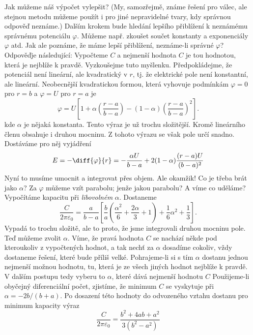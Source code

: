     Jak můžeme náš výpočet vylepšit? (My, samozřejmě, známe řešení pro válec, ale stejnou metodu
    můžeme použít i pro jiné nepravidelné tvary, kdy správnou odpověď neznáme.) Dalším krokem bude
    hledání lepšího přiblížení k neznámému správnému potenciálu \(\varphi\). Můžeme např. zkoušet
    součet konstanty a exponenciály \(\varphi\) atd. Jak ale poznáme, že máme lepší přiblížení,
    neznáme-li správné \(\varphi\)? Odpověďje následující: Vypočteme \(C\) a nejmenší hodnota \(C\)
    je tou hodnotou, která je nejblíže k pravdě. Vyzkoušejme tuto myšlenku. Předpokládejme, že
    potenciál není lineární, ale kvadratický v \(r\), tj. že elektrické pole není konstantní, ale
    lineární. Neobecnější kvadratickou formou, která vyhovuje podmínkám \(\varphi = 0\) pro \(r=b\)
    a \(\varphi=U\) pro \(r=a\) je
    \begin{equation*}
      \varphi = U\left[1 + \alpha \left(\dfrac{r-a}{b-a}\right) 
                    - (1 - \alpha)\left(\dfrac{r-a}{b-a}\right)^2\right].
    \end{equation*}
    kde \(\alpha\) je nějaká konstanta. Tento výraz je už trochu složitější. Kromě lineárního členu
    obsahuje i druhou mocninu. Z tohoto výrazu se však pole určí snadno. Dostáváme pro něj vyjádření
    \begin{equation*}
      E = -\diff{\varphi}{r} = - \dfrac{\alpha U}{b-a} + 2(1 - \alpha)\dfrac{(r-a)U}{(b-a)^2}
    \end{equation*}
    Nyní to musíme umocnit a integrovat přes objem. Ale okamžik! Co je třeba brát jako \(\alpha\)?
    Za \(\varphi\) můžeme vzít parabolu; jenže jakou parabolu? A víme co uděláme? Vypočítáme
    kapacitu při \emph{libovolném} \(\alpha\). Dostaneme
    \begin{equation*}
      \dfrac{C}{2\pi\varepsilon_0} = 
      \dfrac{a}{b-a}\left[
          \dfrac{b}{a}\left(\dfrac{\alpha^2}{6}+\dfrac{2\alpha}{3}+1\right) + 
          \dfrac{1}{6}\alpha^2+\dfrac{1}{3}
      \right].
    \end{equation*}
    Vypadá to trochu složitě, ale to proto, že jsme integrovali druhou mocninu pole. Teď můžeme
    zvolit \(\alpha\). Víme, že pravá hodnota \(C\) se nachází někde pod kteroukoliv z vypočtených
    hodnot, a tak nechť za \(\alpha\) dosadíme cokoliv, vždy dostaneme řešení, které bude příliš
    velké. Pohrajeme-li si s tím \(\alpha\) dostanu jednou nejmenší možnou hodnotu, tu, která je ze
    všech jiných hodnot nejblíže k pravdě. V dalším postupu tedy vyberu to \(\alpha\), které dává
    nejmenší hodnotu \(C\) Použijeme-li obyčejný diferenciální počet, zjistíme, že minimum \(C\) se
    vyskytuje při \(\alpha = - 2 b/(b + a)\). Po dosazení této hodnoty do odvozeného vztahu dostanu
    pro minimum kapacity výraz
    \begin{equation*}
      \dfrac{C}{2\pi\varepsilon_0} = \dfrac{b^2 + 4ab + a^2}{3(b^2 - a^2)}
    \end{equation*}

